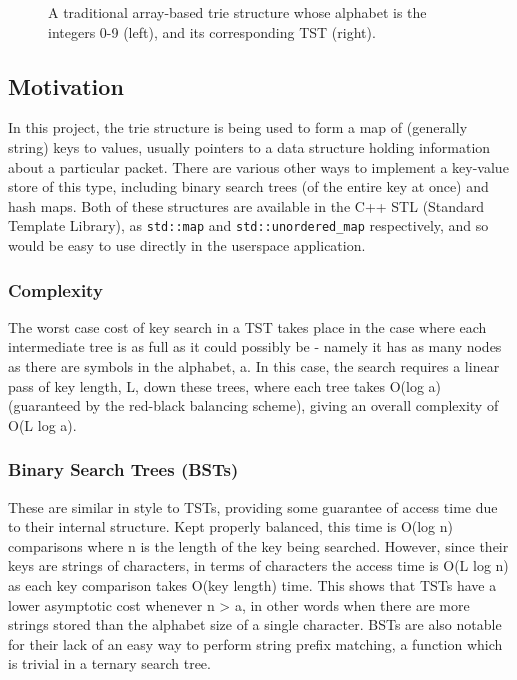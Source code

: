 \documentclass[a4paper,12pt,twoside,openright]{report}
\begin{document}
	\begin{figure}
		\label{fig:trie-tst}
		\caption{A traditional array-based trie structure whose alphabet is the integers 0-9 (left), and its corresponding TST (right).}
	\end{figure}
	
	\subsection{Motivation}
	
	In this project, the trie structure is being used to form a map of (generally string) keys to values, usually pointers to a data structure holding information about a particular packet. There are various other ways to implement a key-value store of this type, including binary search trees (of the entire key at once) and hash maps. Both of these structures are available in the C++ STL (Standard Template Library), as \verb|std::map| and \verb|std::unordered_map| respectively, and so would be easy to use directly in the userspace application.
	
	\subsubsection{Complexity}
	
	The worst case cost of key search in a TST takes place in the case where each intermediate tree is as full as it could possibly be - namely it has as many nodes as there are symbols in the alphabet, a. In this case, the search requires a linear pass of key length, L, down these trees, where each tree takes O(log a) (guaranteed by the red-black balancing scheme), giving an overall complexity of O(L log a).
	
	\subsubsection{Binary Search Trees (BSTs)}
	
	These are similar in style to TSTs, providing some guarantee of access time due to their internal structure. Kept properly balanced, this time is O(log n) comparisons where n is the length of the key being searched. However, since their keys are strings of characters, in terms of characters the access time is O(L log n) as each key comparison takes O(key length) time. This shows that TSTs have a lower asymptotic cost whenever n > a, in other words when there are more strings stored than the alphabet size of a single character. BSTs are also notable for their lack of an easy way to perform string prefix matching, a function which is trivial in a ternary search tree.
	
\end{document}
